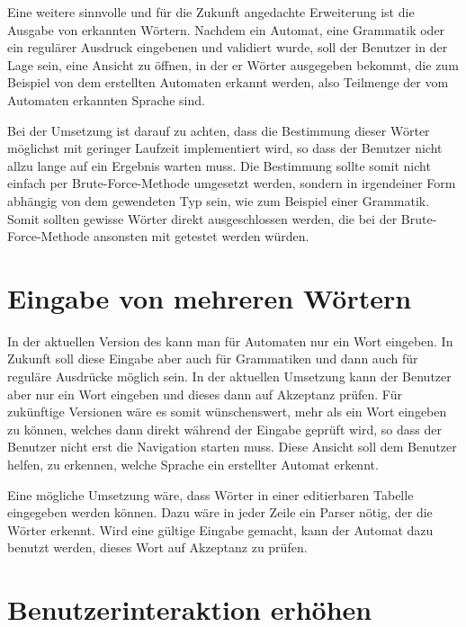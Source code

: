 Eine weitere sinnvolle und für die Zukunft angedachte Erweiterung ist die Ausgabe
von erkannten Wörtern. Nachdem ein Automat, eine Grammatik oder ein regulärer
Ausdruck eingebenen und validiert wurde, soll der Benutzer in der Lage sein, eine
Ansicht zu öffnen, in der er Wörter ausgegeben bekommt, die zum Beispiel von dem
erstellten Automaten erkannt werden, also Teilmenge der vom Automaten erkannten
Sprache sind.\vspace{10pt}

Bei der Umsetzung ist darauf zu achten, dass die Bestimmung dieser Wörter
möglichst mit geringer Laufzeit implementiert wird, so dass der Benutzer nicht
allzu lange auf ein Ergebnis warten muss. Die Bestimmung sollte somit nicht
einfach per Brute-Force-Methode umgesetzt werden, sondern in irgendeiner Form
abhängig von dem gewendeten Typ sein, wie zum Beispiel einer Grammatik. Somit
sollten gewisse Wörter direkt ausgeschlossen werden, die bei der
Brute-Force-Methode ansonsten mit getestet werden würden.\vspace{10pt}


\section{Eingabe von mehreren Wörtern}\label{PerspectiveMultiplyWordInput}

In der aktuellen Version des \gtitools kann man für Automaten nur ein Wort
eingeben. In Zukunft soll diese Eingabe aber auch für Grammatiken und dann auch
für reguläre Ausdrücke möglich sein. In der aktuellen Umsetzung kann der Benutzer
aber nur ein Wort eingeben und dieses dann auf Akzeptanz prüfen. Für zukünftige
Versionen wäre es somit wünschenswert, mehr als ein Wort eingeben zu können,
welches dann direkt während der Eingabe geprüft wird, so dass der Benutzer
nicht erst die Navigation starten muss. Diese Ansicht soll dem Benutzer helfen,
zu erkennen, welche Sprache ein erstellter Automat erkennt.\vspace{10pt}

Eine mögliche Umsetzung wäre, dass Wörter in einer editierbaren Tabelle
eingegeben werden können. Dazu wäre in jeder Zeile ein Parser nötig, der die
Wörter erkennt. Wird eine gültige Eingabe gemacht, kann der Automat dazu
benutzt werden, dieses Wort auf Akzeptanz zu prüfen.\vspace{10pt}


\section{Benutzerinteraktion erhöhen}\label{PerspectiveInteraction}

